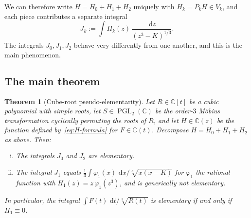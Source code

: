 \documentclass[11pt,a4paper]{article}
\theoremstyle{plain}
\newtheorem{theorem}{Theorem}[section]
\theoremstyle{definition}
\theoremstyle{remark}
\newcommand{\C}{\mathbb{C}}
\newcommand{\PGL}{\operatorname{PGL}}
\renewcommand{\d}{\,\mathrm{d}}
\begin{document}
We can therefore write $H = H_0 + H_1 + H_2$ uniquely with $H_k = P_k H \in V_k$, and each piece contributes a separate integral
\[
  J_k := \int H_k(z)\,\frac{\d z}{(z^3-K)^{1/3}}.
\]
The integrals $J_0,J_1,J_2$ behave very differently from one another, and this is the main phenomenon.

\subsection{The main theorem}

\begin{theorem}[Cube-root pseudo-elementarity]\label{thm:cubic-goursat}
Let $R\in\C[t]$ be a cubic polynomial with simple roots, let $S\in\PGL_2(\C)$ be the order-$3$ M\"obius transformation cyclically permuting the roots of $R$, and let $H\in\C(z)$ be the function defined by~\eqref{eq:H-formula} for $F\in\C(t)$. Decompose $H=H_0+H_1+H_2$ as above. Then:
\begin{enumerate}[(i)]
  \item The integrals $J_0$ and $J_2$ are elementary.
  \item The integral $J_1$ equals $\frac{1}{3}\int \varphi_1(x)\,\d x/\sqrt[3]{x(x-K)}$ for $\varphi_1$ the rational function with $H_1(z)=z\,\varphi_1(z^3)$, and is generically not elementary.
\end{enumerate}

In particular, the integral $\int F(t)\,\d t/\sqrt[3]{R(t)}$ is elementary if and only if $H_1\equiv 0$.
\end{theorem}
\end{document}
